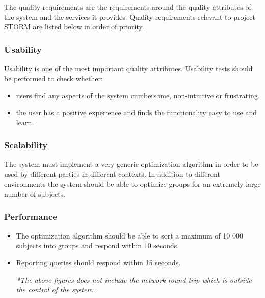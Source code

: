 The quality requirements are the requirements around the quality attributes of the system and
the services it provides. Quality requirements relevant to project STORM are listed below in order of priority. \par

\subsubsection{Usability}
Usability is one of the most important quality attributes. Usability tests should be performed to check whether:
\begin{itemize}
\item users find any aspects of the system cumbersome, non-intuitive or frustrating.
\item the user has a positive experience and finds the functionality easy to use and learn.
\end{itemize}

\subsubsection{Scalability}
The system must implement a very generic optimization algorithm in order to be used by different parties in different contexts. In addition to different environments the system should be able to optimize groups for an extremely large number of subjects.

\subsubsection{Performance}
\begin{itemize}
\item The optimization algorithm should be able to sort a maximum of 10 000 subjects into groups and respond within 10 seconds.
\item Reporting queries should respond within 15 seconds. \par
\textit {*The above figures does not include the network round-trip which is outside the control of the system.}
\end{itemize}

